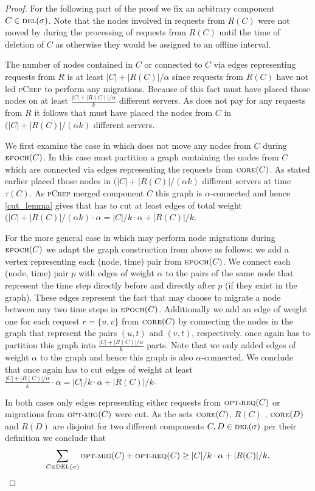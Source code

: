 \documentclass[a4paper,UKenglish,cleveref, autoref, thm-restate,authorcolumns]{lipics-v2019}
\newcommand{\adjDel}{\textsc{pCrep}}
\newcommand{\optmig}{\text{\scriptsize OPT-MIG}}
\newcommand{\optreq}{\text{\scriptsize OPT-REQ}}
\newcommand{\del}{\text{\scriptsize DEL}}
\newcommand{\opt}{\text{O{\scriptsize PT}}}
\newcommand{\core}{\text{\scriptsize CORE}}
\newcommand{\epoch}{\text{\scriptsize EPOCH}}
\begin{document}
\begin{proof}
	For the following part of the proof we fix an arbitrary component $C\in\del{}(\sigma)$. Note that the nodes involved in requests from $R(C)$ were not moved by \opt{} during the processing of requests from $R(C)$ until the time of deletion of $C$ as otherwise they would be assigned to an offline interval.
	
	The number of nodes contained in $C$ or connected to $C$ via edges representing requests from $R$ is at least $|C|+|R(C)|/\alpha$ since requests from $R(C)$ have not led \adjDel{} to perform any migrations. Because of this fact \opt{} must have placed those nodes on at least $\frac{|C|+|R(C)|/\alpha}{k}$ different servers. As \opt{} does not pay for any requests from $R$ it follows that \opt{} must have placed the nodes from $C$ in $(|C|+|R(C)|/(\alpha k)$ different servers.
	
	We first examine the case in which \opt{} does not move any nodes from $C$ during $\epoch(C)$. In this case \opt{} must partition a graph containing the nodes from $C$ which are connected via edges representing the requests from $\core(C)$. As stated earlier \opt{} placed those nodes in $(|C|+|R(C)|/(\alpha k)$ different servers at time $\tau(C)$. As \adjDel{} merged component $C$ this graph is $\alpha$-connected and hence \cref{cut_lemma} gives that \opt{} has to cut at least edges of total weight $(|C|+|R(C)|/(\alpha k)\cdot\alpha=|C|/k\cdot\alpha+|R(C)|/k$.
	
	For the more general case in which \opt{} may perform node migrations during $\epoch(C)$ we adapt the graph construction from above as follows: we add a vertex representing each (node, time) pair from $\epoch(C)$.
	We connect each (node, time) pair $p$ with edges of weight $\alpha$ to the pairs of the same node that represent the time step directly before and directly after $p$ (if they exist in the graph). These edges represent the fact that \opt{} may choose to migrate a node between any two time steps in $\epoch(C)$.
	Additionally we add an edge of weight one for each request $r=\{u,v\}$ from $\core(C)$ by connecting the nodes in the graph that represent the pairs $(u,t)$ and $(v,t)$, respectively. \opt{} once again has to partition this graph into $\frac{|C|+|R(C)|/\alpha}{k}$ parts.
	Note that we only added edges of weight $\alpha$ to the graph and hence this graph is also $\alpha$-connected. We conclude that once again \opt{} has to cut edges of weight at least $\frac{|C|+|R(C)|/\alpha}{k}\cdot\alpha=|C|/k\cdot\alpha+|R(C)|/k$.
	
	In both cases only edges representing either requests from $\optreq(C)$ or migrations from $\optmig(C)$ were cut.
	As the sets $\core(C)$, $R(C)$ , $\core(D)$ and $R(D)$ are disjoint for two different components $C,D\in\del(\sigma)$ per their definition we conclude that
	\begin{align*}
	\sum_{C\in\del(\sigma)}\optmig(C)+\optreq(C)\geq |C|/k\cdot\alpha+|R(C)|/k.
	\end{align*}
\end{proof}
\end{document}
